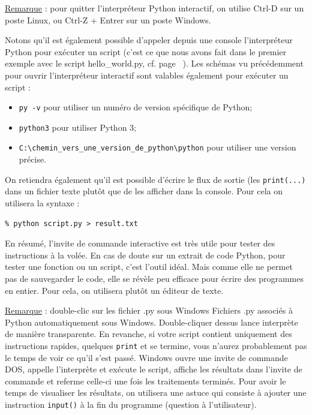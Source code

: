 \documentclass[12pt, a4paper]{article}
\begin{document}
\underline{Remarque} : pour quitter l'interpréteur Python interactif, on utilise Ctrl-D sur un poste Linux, ou Ctrl-Z + Entrer sur un poste Windows.

Notons qu'il est également possible d'appeler depuis une console l'interpréteur Python pour exécuter un script (c'est ce que nous avons fait dans le premier exemple avec le script hello\_world.py, cf. page ~\pageref{hello_world}). Les schémas vu précédemment pour ouvrir l'interpréteur interactif sont valables également pour exécuter un script :
\begin{itemize}
	\item \lstinline{py -v} pour utiliser un numéro de version spécifique de Python;
	\item \lstinline{python3} pour utiliser Python 3;
	\item \lstinline{C:\chemin_vers_une_version_de_python\python} pour utiliser une version précise.
\end{itemize}

On retiendra également qu'il est possible d'écrire le flux de sortie (les \lstinline{print(...)} dans un fichier texte plutôt que de les afficher dans la console. Pour cela on utilisera la syntaxe :
\begin{lstlisting}
% python script.py > result.txt
\end{lstlisting}

En résumé, l'invite de commande interactive est très utile pour tester des instructions à la volée. En cas de doute sur un extrait de code Python, pour tester une fonction ou un script, c'est l'outil idéal. Mais comme elle ne permet pas de sauvegarder le code, elle se révèle peu efficace pour écrire des programmes en entier. Pour cela, on utilisera plutôt un éditeur de texte. 

\underline{Remarque} : double-clic sur les fichier .py sous Windows
Fichiers .py associés à Python automatiquement sous Windows. Double-cliquer dessus lance interprète de manière transparente. En revanche, si votre script contient uniquement des instructions rapides, quelques \lstinline{print} et se termine, vous n'aurez probablement pas le temps de voir ce qu'il s'est passé. Windows ouvre une invite de commande DOS, appelle l'interprète et exécute le script, affiche les résultats dans l'invite de commande et referme celle-ci une fois les traitements terminés. Pour avoir le temps de visualiser les résultats, on utilisera une astuce qui consiste à ajouter une instruction \lstinline{input()} à la fin du programme (question à l'utilisateur).
\end{document}
